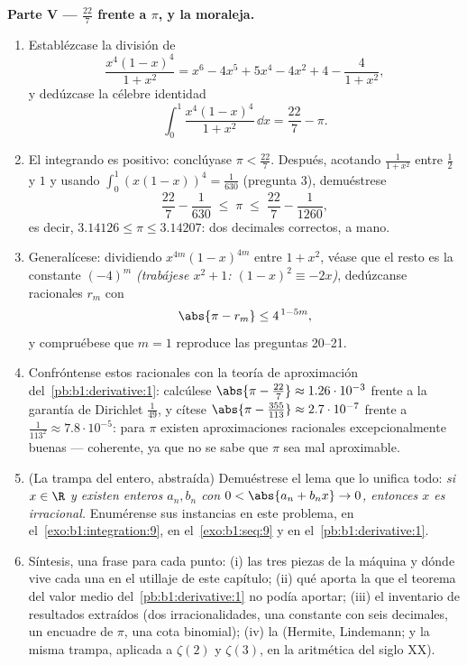 \begin{problem}
\medskip
\noindent\textbf{Parte V --- $\frac{22}{7}$ frente a $\pi$, y la
moraleja.}
\begin{enumerate}[resume]
  \item Establézcase la división de 
        \[
        \frac{x^4(1-x)^4}{1 + x^2}
        = x^6 - 4x^5 + 5x^4 - 4x^2 + 4 - \frac{4}{1 + x^2},
        \]
        y dedúzcase la célebre identidad
        \[
        \int_0^1 \frac{x^4 (1-x)^4}{1 + x^2}\,\dd x
        = \frac{22}{7} - \pi .
        \]
  \item El integrando es positivo: conclúyase $\pi < \frac{22}{7}$.
        Después, acotando $\frac{1}{1+x^2}$ entre $\frac12$ y $1$ y
        usando $\int_0^1 (x(1-x))^4 = \frac{1}{630}$ (pregunta 3),
        demuéstrese
        \[
        \frac{22}{7} - \frac{1}{630} \;\leq\; \pi \;\leq\;
        \frac{22}{7} - \frac{1}{1260} ,
        \]
        es decir, $3.14126 \leq \pi \leq 3.14207$: dos decimales
        correctos, a mano.
  \item Generalícese: dividiendo $x^{4m}(1-x)^{4m}$ entre $1 + x^2$,
        véase que el resto es la constante $(-4)^m$ \emph{(trabájese
         $x^2 + 1$: $(1-x)^2 \equiv -2x$)}, dedúzcanse
        racionales $r_m$ con
        \[
        \abs{\pi - r_m} \leq 4^{\,1 - 5m} ,
        \]
        y compruébese que $m = 1$ reproduce las preguntas 20--21.
  \item Confróntense estos racionales con la teoría de aproximación
        del~\cref{pb:b1:derivative:1}: calcúlese
        $\abs{\pi - \frac{22}{7}} \approx 1.26\cdot10^{-3}$ frente a
        la garantía de Dirichlet $\frac{1}{49}$, y cítese
        $\abs{\pi - \frac{355}{113}} \approx 2.7\cdot10^{-7}$ frente
        a $\frac{1}{113^2} \approx 7.8\cdot10^{-5}$: para $\pi$
        existen aproximaciones racionales excepcionalmente buenas ---
        coherente, ya que no se sabe que $\pi$ sea mal aproximable.
  \item (La trampa del entero, abstraída) Demuéstrese el lema que lo
        unifica todo: \emph{si $x \in \R$ y existen enteros
        $a_n, b_n$ con $0 < \abs{a_n + b_n x} \to 0$, entonces $x$
        es irracional.} Enumérense sus instancias en este problema,
        en el~\cref{exo:b1:integration:9}, en el~\cref{exo:b1:seq:9}
        y en el~\cref{pb:b1:derivative:1}.
  \item Síntesis, una frase para cada punto: (i) las tres piezas de
        la máquina y dónde vive cada una en el utillaje de este
        capítulo; (ii) qué aporta la  que el teorema del
        valor medio del~\cref{pb:b1:derivative:1} no podía aportar;
        (iii) el inventario de resultados extraídos (dos
        irracionalidades, una constante con seis decimales, un
        encuadre de $\pi$, una cota binomial); (iv) la 
        (Hermite, Lindemann; y la misma trampa, aplicada a
        $\zeta(2)$ y $\zeta(3)$, en la aritmética del siglo XX).
\end{enumerate}
\end{problem}
